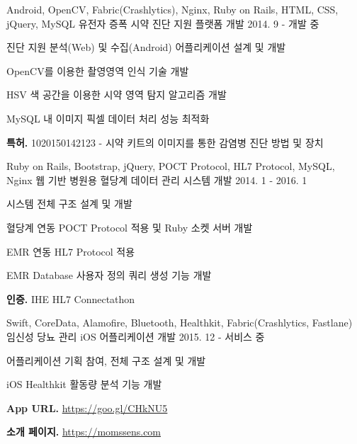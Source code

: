 \begin{cvexpentries}
  \cvexpentry
    {Android, OpenCV, Fabric(Crashlytics), Nginx, Ruby on Rails, HTML, CSS, jQuery, MySQL}
    {유전자 증폭 시약 진단 지원 플랫폼 개발}
    {2014. 9 - 개발 중}
    {}
    {
        \begin{cvitems}
            \item {진단 지원 분석(Web) 및 수집(Android) 어플리케이션 설계 및 개발}
            \item {OpenCV를 이용한 촬영영역 인식 기술 개발}
            \item {HSV 색 공간을 이용한 시약 영역 탐지 알고리즘 개발}
            \item {MySQL 내 이미지 픽셀 데이터 처리 성능 최적화}
            \item {\textbf{특허.} 1020150142123 - 시약 키트의 이미지를 통한 감염병 진단 방법 및 장치}
        \end{cvitems}
    }
\end{cvexpentries}

\begin{cvexpentries}
  \cvexpentry
    {Ruby on Rails, Bootstrap, jQuery, POCT Protocol, HL7 Protocol, MySQL, Nginx}
    {웹 기반 병원용 혈당계 데이터 관리 시스템 개발}
    {2014. 1 - 2016. 1}
    {}
    {
        \begin{cvitems}
            \item {시스템 전체 구조 설계 및 개발}
            \item {혈당계 연동 POCT Protocol 적용 및 Ruby 소켓 서버 개발}
            \item {EMR 연동 HL7 Protocol 적용}
            \item {EMR Database 사용자 정의 쿼리 생성 기능 개발}
            \item {\textbf{인증.} IHE HL7 Connectathon}
        \end{cvitems}
    }
\end{cvexpentries}

\begin{cvexpentries}
  \cvexpentry
    {Swift, CoreData, Alamofire, Bluetooth, Healthkit, Fabric(Crashlytics, Fastlane)}
    {임신성 당뇨 관리 iOS 어플리케이션 개발}
    {2015. 12 - 서비스 중}
    {}
    {
        \begin{cvitems}
            \item {어플리케이션 기획 참여, 전체 구조 설계 및 개발}
            \item {iOS Healthkit 활동량 분석 기능 개발}
            \item {\textbf{App URL.} \href{https://goo.gl/CHkNU5}{https://goo.gl/CHkNU5}}
            \item {\textbf{소개 페이지.} \href{https://momssens.com}{https://momssens.com}}
        \end{cvitems}
    }
\end{cvexpentries}

